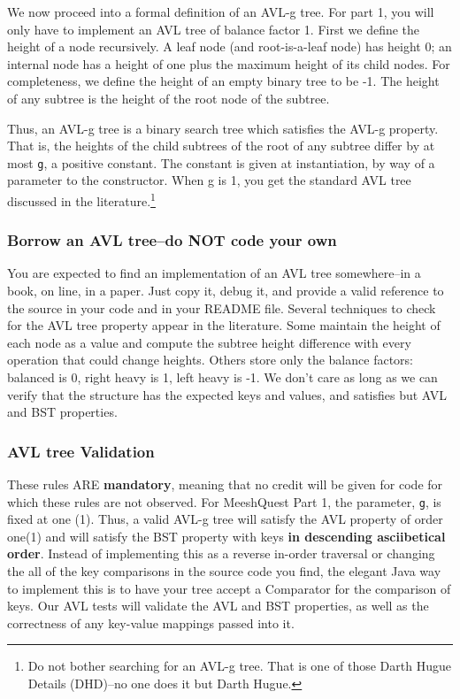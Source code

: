\documentclass[12pt]{article}
\begin{document}
We now proceed into a formal definition of an AVL-g tree. For part 1,
you will only have to implement an AVL tree of balance factor 1. First
we define the height of a node recursively.  A leaf
node (and root-is-a-leaf node) has height 0;  an internal node has a height 
of  one plus  the maximum height of its  child nodes. For
completeness,  we define the
height of an empty binary tree to be -1.  The height of any subtree is the
height of the root node of the subtree.

Thus, an AVL-g tree is  a binary search tree which satisfies the AVL-g
property. That is, the heights of the child
subtrees of the root of any 
subtree differ by at most \texttt{g}, a positive constant.
The constant is given at instantiation,
by way of a parameter to the constructor.  
When g is 1, you get the standard AVL tree discussed in the
literature.\footnote{Do not bother searching for an AVL-g tree.  That is
  one of those Darth Hugue Details (DHD)--no one does it but Darth Hugue.}


\subsubsection{Borrow an AVL tree--do NOT code your own}
You are expected to find an implementation of an AVL tree
somewhere--in a book, on line, in a paper. Just copy it, debug it, and
provide a valid reference to the source in your code and in your
README file.  Several techniques  to check for the AVL tree property
appear in the literature. Some maintain the height of each node as a
value and compute the subtree height difference with every operation
that could change heights.   Others store only the balance factors:
balanced is 0, right heavy is 1,  left heavy is -1.  We don't care as
long as we can verify that the structure has the expected  keys and
values,  and
satisfies but AVL and BST properties.




\subsubsection{AVL tree Validation}

These rules ARE \textbf{mandatory}, meaning that
no credit will be given for code for which these rules are not observed.
For MeeshQuest Part 1,  the parameter, \texttt{g}, is fixed at one
(1).
Thus, a valid AVL-g tree will satisfy the AVL property of order one(1)
and will  satisfy the BST property with keys
\textbf{in descending asciibetical order}.
Instead of implementing this as a reverse in-order traversal or changing the all of the 
key comparisons in the source code you find, the elegant Java way to implement this is to
have your tree accept a Comparator for the comparison of keys.
Our 
AVL tests will validate  the  AVL and 
BST properties, as well as  the correctness of any key-value mappings passed into it. 
\end{document}
